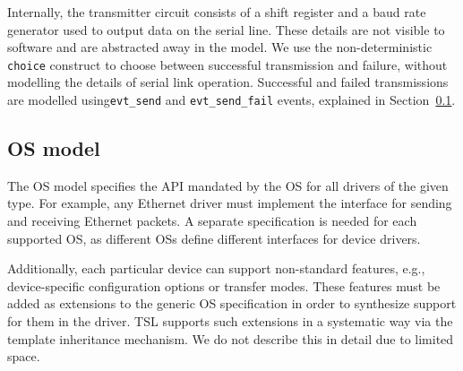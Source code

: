 \documentclass{book}
\newcommand{\tsl}{TSL\xspace}
\theoremstyle{definition}
\newcommand{\src}[1]{\texttt{\small #1}}
\begin{document}
Internally, the transmitter circuit consists of a shift register and a baud rate generator used to output data on the serial line.  These details are not visible to software and are abstracted away in the model.  We use the non-deterministic \src{choice} construct to choose between successful transmission and failure, without modelling the details of serial link operation.  Successful and failed transmissions are modelled using\src{evt\_send} and \src{evt\_send\_fail} events, explained in Section~\ref{s:os}.

%

\subsection{OS model}\label{s:os}

The OS model specifies the API mandated by the OS for all drivers of the given type.  For example, any Ethernet driver must implement the interface for sending and receiving Ethernet packets.  A separate specification is needed for each supported OS, as different OSs define different interfaces for device drivers.


Additionally, each particular device can support non-standard features, e.g., device-specific configuration options or transfer modes.  These features must be added as extensions to the generic OS specification in order to synthesize support for them in the driver.  \tsl supports such extensions in a systematic way via the template inheritance mechanism.  We do not describe this in detail due to limited space.
\end{document}
